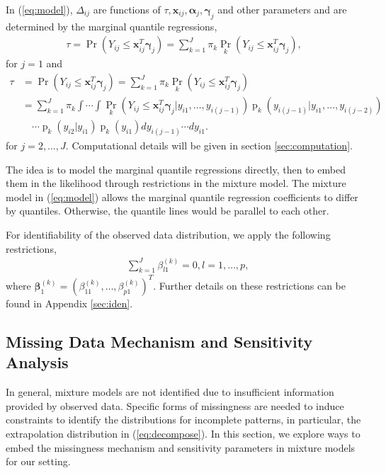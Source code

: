 \documentclass[12pt]{article}
\DeclareMathOperator{\pr}{p}
\DeclareMathOperator{\prob}{Pr}
\begin{document}
In (\ref{eq:model}), $\Delta_{ij}$ are functions of $\tau, \bm x_{ij},
\bm \alpha_j, \bm \gamma_j$ and other parameters and are determined by
the marginal quantile regressions,
\begin{align}
  \label{eq:deltaeqn1}
  \tau = \prob (Y_{ij} \leq \bm x_{ij}^T \bm \gamma_j ) = \sum_{k=1}^J
  \pi_k\prob_k (Y_{ij} \leq \bm x_{ij}^T \bm \gamma_j ),
\end{align}
for $j = 1$ and
\begin{align}\label{eq:deltaeqn2}
  \tau &= \prob (Y_{ij} \leq \bm x_{ij}^{T} \bm \gamma_j ) =
  \sum_{k=1}^J
  \pi_k\prob_k (Y_{ij} \leq \bm x_{ij}^{T} \bm \gamma_j ) \\
  & = \sum_{k=1}^J \pi_k \int\cdots \int \prob_k (Y_{ij} \leq \bm
  x_{ij}^{T} \bm \gamma_j |y_{i1},\ldots,
  y_{i(j-1)}) \pr_k (y_{i(j-1)}| y_{i1}, \ldots, y_{i(j-2)})  \nonumber \\
  & \quad \cdots \pr_k (y_{i2}| y_{i1}) \pr_k(y_{i1})
  dy_{i(j-1)}\cdots dy_{i1}. \nonumber
\end{align}
for $j = 2, \ldots, J$. Computational details will be given in section
\ref{sec:computation}.

The idea is to model the marginal quantile regressions directly, then
to embed them in the likelihood through restrictions in the mixture
model. The mixture model in (\ref{eq:model}) allows the marginal
quantile regression coefficients to differ by quantiles. Otherwise,
the quantile lines would be parallel to each other.

For identifiability of the observed data distribution, we apply the
following restrictions,
\begin{align*}
  & \sum_{k=1}^J \beta_{l1}^{(k)} = 0, l = 1,\ldots, p,
\end{align*}
where $\bm \beta_1^{(k)} = (\beta_{11}^{(k)}, \ldots,
\beta_{p1}^{(k)})^{T}$. Further details on these restrictions can be
found in Appendix \ref{sec:iden}.

\subsection{Missing Data Mechanism and Sensitivity Analysis}
\label{sec:sa}

In general, mixture models are not identified due to insufficient
information provided by observed data. Specific forms of missingness
are needed to induce constraints to identify the distributions for
incomplete patterns, in particular, the extrapolation distribution in
(\ref{eq:decompose}). In this section, we explore ways to embed the
missingness mechanism and sensitivity parameters in mixture models for
our setting.
\end{document}
